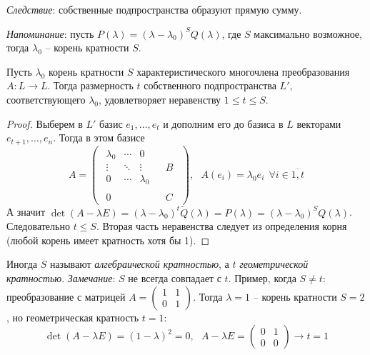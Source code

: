 \textit{Следствие}: собственные подпространства образуют прямую сумму.

\textit{Напоминание}: пусть $P(\lambda)=(\lambda-\lambda_0)^SQ(\lambda)$, где $S$ максимально возможное, тогда $\lambda_0$ -- корень кратности $S$.
\begin{theorem}
    Пусть $\lambda_0$ корень кратности $S$ характеристического многочлена преобразования $A:L\to L$. Тогда размерность $t$ собственного подпространства $L'$, соответствующего $\lambda_0$, удовлетворяет неравенству $1\leqslant t\leqslant S$.
\end{theorem}
\begin{proof}
    Выберем в $L'$ базис $e_1, \dots, e_t$ и дополним его до базиса в $L$ векторами $e_{t+1}, \dots, e_n$. Тогда в этом базисе
\[
A=\left(
\begin{array}{c|c}
\begin{matrix}
\lambda_0 & \cdots & 0 \\
\vdots & \ddots& \vdots\\
0 & \cdots& \lambda_0
\end{matrix}
& 
\begin{matrix}
B
\end{matrix} \\
\hline
\begin{matrix}
0
\end{matrix}
& 
\begin{matrix}
C
\end{matrix}
\end{array}
\right), \ \ \ A(e_i)=\lambda_0 e_i \ \ \forall i \in \overline{1,t}
\]
А значит $\det (A-\lambda E)=(\lambda-\lambda_0)^t\tilde{Q}(\lambda)=P(\lambda)=(\lambda-\lambda_0)^SQ(\lambda)$. Следовательно $t\leqslant S$. Вторая часть неравенства следует из определения корня (любой корень имеет кратность хотя бы 1).
\end{proof}
Иногда $S$ называют \textit{алгебраической кратностью}, а $t$ \textit{геометрической кратностью}.
\textit{Замечание}: $S$ не всегда совпадает с $t$. Пример, когда $S\neq t$:
преобразование с матрицей $A=\left(\begin{matrix}
    1&1\\0&1
\end{matrix}\right)$. Тогда $\lambda=1$ -- корень кратности $S=2$, но геометрическая кратность $t=1$: \[
\det (A-\lambda E)=(1-\lambda)^2=0, \ \ \ A-\lambda E=\left(\begin{matrix}
    0&1\\0&0
\end{matrix}\right) \to t=1
\]

